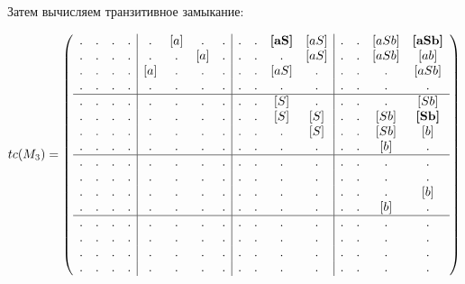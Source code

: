 \begin{example}
Затем вычисляем транзитивное замыкание:

\begin{align}
tc(M_3) =
\left(\begin{array}{c c c c | c c c c | c c c c | c c c c } 
. & . & . & .  &  . & [a] & . & .  &  . & . & \textbf{[aS]} & [aS]  &  . & . & [aSb] & \textbf{[aSb]}  \\
. & . & . & .  &  . & . & [a] & .  &  . & . & .             & [aS]  &  . & . & [aSb] & [ab]          \\
. & . & . & .  &  [a] & . & . & .  &  . & . & [aS]          & .     &  . & . & .     & [aSb]         \\
. & . & . & .  &  . & . & . & .    &  . & . & .             & .     &  . & . & .     & .             \\
\hline
. & . & . & .  &  . & . & . & .    &  . & . & [S] & .             &  . & . & .    & [Sb]    \\
. & . & . & .  &  . & . & . & .    &  . & . & [S] & [S]           &  . & . & [Sb] & \textbf{[Sb]}    \\
. & . & . & .  &  . & . & . & .    &  . & . & .   & [S]           &  . & . & [Sb] & [b]  \\
. & . & . & .  &  . & . & . & .    &  . & . & .   & .             &  . & . & [b]  & .    \\
\hline                                                              
. & . & . & .  &  . & . & . & .    &  . & . & . & .               &  . & . & .    & .   \\
. & . & . & .  &  . & . & . & .    &  . & . & . & .               &  . & . & .    & .   \\
. & . & . & .  &  . & . & . & .    &  . & . & . & .               &  . & . & .    & [b] \\
. & . & . & .  &  . & . & . & .    &  . & . & . & .               &  . & . & [b]  & . \\
\hline                                                              
. & . & . & .  &  . & . & . & .    &  . & . & . & .               &  . & . & . & .   \\
. & . & . & .  &  . & . & . & .    &  . & . & . & .               &  . & . & . & .   \\
. & . & . & .  &  . & . & . & .    &  . & . & . & .               &  . & . & . & .   \\
. & . & . & .  &  . & . & . & .    &  . & . & . & .               &  . & . & . & . 
\end{array}\right)
\end{align}


\end{example}
